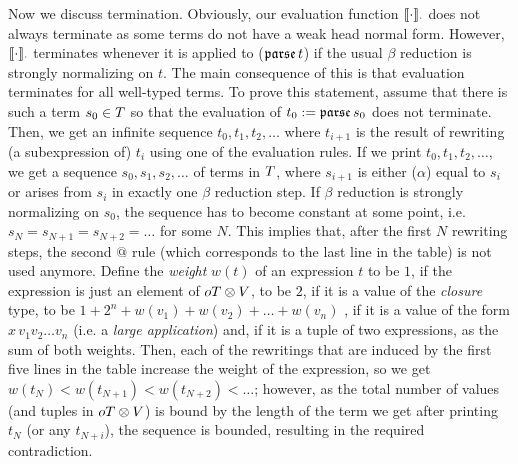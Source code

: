 \documentclass[submission,copyright,creativecommons]{eptcs}
\begin{document}
Now we discuss termination. Obviously, our evaluation function $\llbracket{\cdot}\rrbracket_{\cdot}$ does not always terminate as some terms do not have a weak head normal form. However, $\llbracket{\cdot}\rrbracket_{\cdot}$ terminates whenever it is applied to (${\mathfrak {parse } \,} t$) if the usual $\beta$ reduction is strongly normalizing on $t$. 
The main consequence of this is that evaluation terminates for all well-typed terms. %
To prove this statement, assume that there is such a term $s_0 \in T$ so that the evaluation of $t_0 := {\mathfrak {parse } \,} s_0$ does not terminate. 
%
Then, we get an infinite sequence $t_0, t_1, t_2, \ldots$ where $t_{i+1}$ is the result of rewriting (a subexpression of) $t_i$ using one of the evaluation rules. If we print $t_0, t_1, t_2, \ldots$, we get a sequence $s_0, s_1, s_2, \ldots$ of terms in $T$, where $s_{i+1}$ is either ($\alpha$) equal to $s_i$ or arises from $s_i$ in exactly one $\beta$ reduction step. If $\beta$ reduction is strongly normalizing on $s_0$, the sequence has to become constant at some point, i.e. $s_N = s_{N+1} = s_{N+2} = \ldots$ for some $N$. This implies that, after the first $N$ rewriting steps, the second $@$ rule (which corresponds to the last line in the table) is not used anymore. Define the \emph{weight} $w(t)$ of an expression $t$ to be $1$, if the expression is just an element of $oT \otimes V$, to be $2$, if it is a value of the \emph{closure} type, to be %
$1 + 2^n + w(v_1) + w(v_2) + \ldots + w(v_n)$
, if it is a value of the form $x \, v_1 v_2 \ldots v_n$ (i.e. a \emph{large application}) and, if it is a tuple of two expressions, as the sum of both weights. Then, each of the rewritings that are induced by the first five lines in the table increase the weight of the expression, so we get $w(t_N) < w(t_{N+1}) < w(t_{N+2}) < \ldots$;  however, as the total number of values (and tuples in $oT \otimes V$) is bound by the length of the term we get after printing $t_N$ (or any $t_{N+i}$), the sequence is bounded, resulting in the required contradiction.
\end{document}
